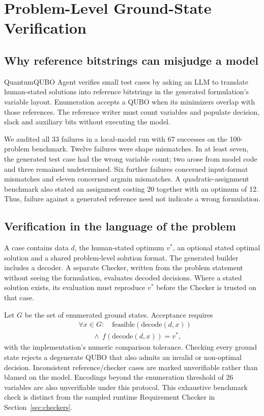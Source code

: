 \section{Problem-Level Ground-State Verification}
\label{sec:verification}
\subsection{Why reference bitstrings can misjudge a model}
QuantumQUBO Agent verifies small test cases by asking an LLM to translate human-stated solutions into reference
bitstrings in the generated formulation's variable layout\cite{mondal2026quantumqubo}. Enumeration accepts a
QUBO when its minimizers overlap with those references. The reference writer must count variables and populate
decision, slack and auxiliary bits without executing the model.

We audited all 33 failures in a local-model run with 67 successes on the 100-problem benchmark. Twelve failures
were shape mismatches. In at least seven, the generated test case had the wrong variable count; two arose from
model code and three remained undetermined. Six further failures concerned input-format mismatches and eleven
concerned argmin mismatches. A quadratic-assignment benchmark also stated an assignment costing 20 together
with an optimum of 12. Thus, failure against a generated reference need not indicate a wrong formulation.

\subsection{Verification in the language of the problem}
A case contains data $d$, the human-stated optimum $v^*$, an optional stated optimal solution and a shared
problem-level solution format. The generated builder includes a decoder. A separate Checker, written from the
problem statement without seeing the formulation, evaluates decoded decisions. Where a stated solution exists,
its evaluation must reproduce $v^*$ before the Checker is trusted on that case.

Let $G$ be the set of enumerated ground states. Acceptance requires
\begin{equation}
\begin{aligned}
 &\forall x\in G:\quad \mathrm{feasible}(\mathrm{decode}(d,x))\\
 &\qquad{}\land\ f(\mathrm{decode}(d,x))=v^*,
\end{aligned}
\end{equation}
with the implementation's numeric comparison tolerance. Checking every ground state rejects a degenerate QUBO
that also admits an invalid or non-optimal decision. Inconsistent reference/checker cases are marked
unverifiable rather than blamed on the model. Encodings beyond the enumeration threshold of 26 variables are
also unverifiable under this protocol. This exhaustive benchmark check is distinct from the sampled runtime
Requirement Checker in Section~\ref{sec:checkers}.


